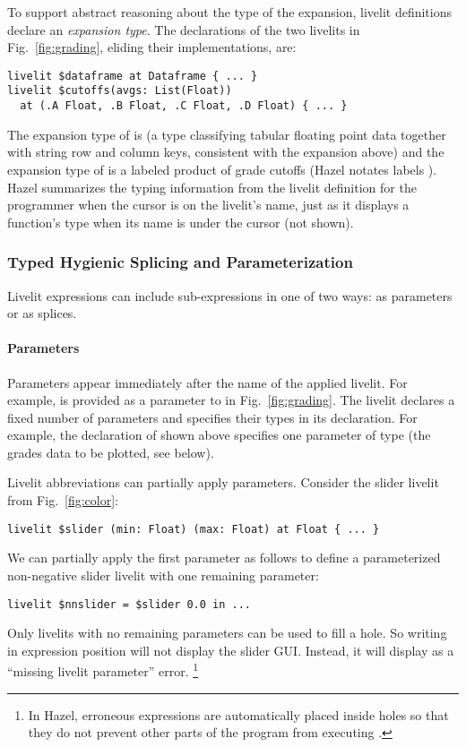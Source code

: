To support abstract reasoning about the type of the expansion, 
livelit definitions declare an \emph{expansion type}.
The declarations of the two livelits in Fig.~\ref{fig:grading}, 
eliding their implementations, are:
\begin{lstlisting}[numbers=none]
livelit $dataframe at Dataframe { ... }
livelit $cutoffs(avgs: List(Float)) 
  at (.A Float, .B Float, .C Float, .D Float) { ... }
\end{lstlisting}
The expansion type of  is  
(a type classifying tabular floating point data together with string row and column keys, consistent with the expansion above)
and the expansion type of  is a labeled product of grade cutoffs (Hazel notates labels ).
Hazel summarizes the typing information from the livelit definition for the programmer when the cursor is on the livelit's name, 
just as it displays a function's type when its name is under the cursor (not shown).

\subsubsection{Typed Hygienic Splicing and Parameterization}\label{sec:splicing-and-parameterization}
Livelit expressions can include sub-expressions in one of two ways:
as parameters or as splices. 

\paragraph{Parameters}\label{sec:parameterization} Parameters appear immediately after the name of the applied livelit. 
For example,  is provided as a parameter to  in Fig.~\ref{fig:grading}.
The livelit declares a fixed number of parameters and specifies their types in its declaration. 
For example, the declaration of  shown above specifies one parameter of type 
(the grades data to be plotted, see below).

Livelit abbreviations can partially apply parameters. Consider the slider livelit
from Fig.~\ref{fig:color}:
\begin{lstlisting}[numbers=none]
livelit $slider (min: Float) (max: Float) at Float { ... }
\end{lstlisting}
We can partially apply the first parameter as follows to define a parameterized non-negative slider livelit with one remaining parameter:
\begin{lstlisting}[numbers=none]
livelit $nnslider = $slider 0.0 in ...
\end{lstlisting}
Only livelits with no remaining parameters can be used to fill a hole.
So writing  in expression position will not display the slider GUI. Instead, it will display as a ``missing livelit parameter'' error.%
\footnote{\label{footnote:typing}In Hazel, erroneous expressions are automatically placed inside holes so that they do not prevent other parts of the program from executing
\cite{HazelnutLive}.}

